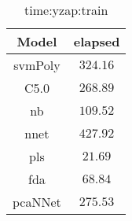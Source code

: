 \begin{table}[!ht]
	\centering
	\begin{tabular}{|c|c|}
		\hline
		Model & elapsed \\ \hline
		svmPoly & $324.16$ \\ \hline
		C5.0 & $268.89$ \\ \hline
		nb & $109.52$ \\ \hline
		nnet & $427.92$ \\ \hline
		pls & $21.69$ \\ \hline
		fda & $68.84$ \\ \hline
		pcaNNet & $275.53$ \\ \hline
	\end{tabular}
	\caption{time:yzap:train}
	\label{tab:time:yzap:train}
\end{table}
